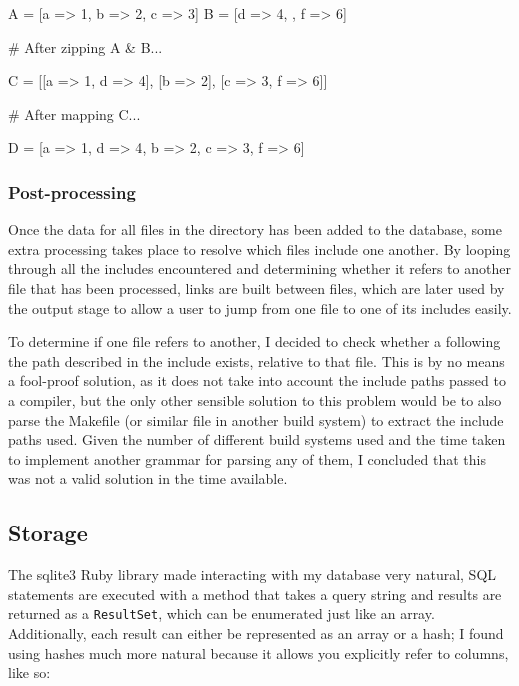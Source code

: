     \begin{code}[language=ruby, gobble=6]
      A = [{a => 1}, {b => 2}, {c => 3}]
      B = [{d => 4}, {}, {f => 6}]

      # After zipping A & B...

      C = [[{a => 1}, {d => 4}], [{b => 2}], [{c => 3}, {f => 6}]]

      # After mapping C...

      D = [{a => 1, d => 4}, {b => 2}, {c => 3, f => 6}]
    \end{code}

      \subsubsection{Post-processing}
        Once the data for all files in the directory has been added to the
        database, some extra processing takes place to resolve which files
        include one another. By looping through all the includes encountered
        and determining whether it refers to another file that has been
        processed, links are built between files, which are later used by the
        output stage to allow a user to jump from one file to one of its
        includes easily.

        To determine if one file refers to another, I decided to check whether a
        following the path described in the include exists, relative to that
        file. This is by no means a fool-proof solution, as it does not take
        into account the include paths passed to a compiler, but the only other
        sensible solution to this problem would be to also parse the Makefile
        (or similar file in another build system) to extract the include paths
        used. Given the number of different build systems used and the time
        taken to implement another grammar for parsing any of them, I concluded
        that this was not a valid solution in the time available.

  \subsection{Storage}
    The sqlite3 Ruby library made interacting with my database very natural, SQL
    statements are executed with a method that takes a query string and results
    are returned as a \lstinline|ResultSet|, which can be enumerated just like
    an array. Additionally, each result can either be represented as an array or
    a hash; I found using hashes much more natural because it allows you
    explicitly refer to columns, like so:

